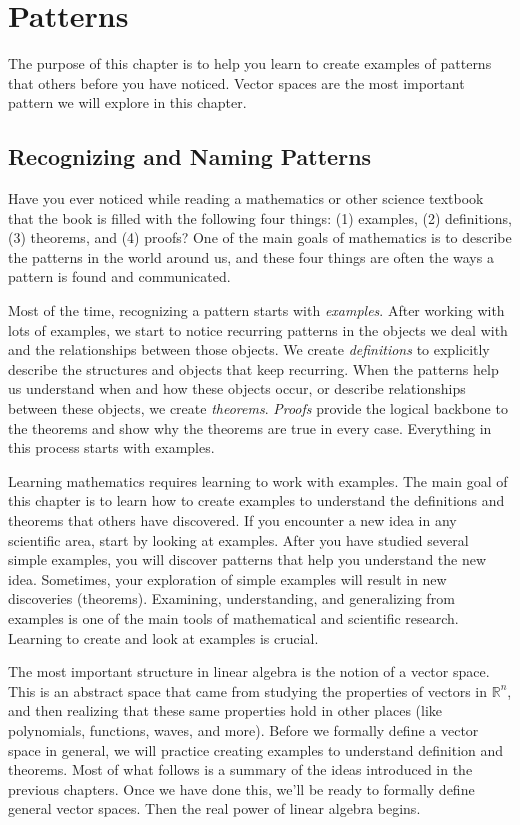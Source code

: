 \chapter{Patterns}


The purpose of this chapter is to help you learn to create examples of patterns that others before you have noticed. Vector spaces are the most important pattern we will explore in this chapter.



\section{Recognizing and Naming Patterns}

Have you ever noticed while reading a mathematics or other science textbook that the book is filled with the following four things: (1) examples, (2) definitions, (3) theorems, and (4) proofs? One of the main goals of mathematics is to describe the patterns in the world around us, and these four things are often the ways a pattern is found and communicated.  

Most of the time, recognizing a pattern starts with \emph{examples}.  After working with lots of examples, we start to notice recurring patterns in the objects we deal with and the relationships between those objects. We create \emph{definitions} to explicitly describe the structures and objects that keep recurring.  When the patterns help us understand when and how these objects occur, or describe relationships between these objects, we create \emph{theorems}.  \emph{Proofs} provide the logical backbone to the theorems and show why the theorems are true in every case. Everything in this process starts with examples.

Learning mathematics requires learning to work with examples. The main goal of this chapter is to learn how to create examples to understand the definitions and theorems that others have discovered.  If you encounter a new idea in any scientific area, start by looking at examples.  After you have studied several simple examples, you will discover patterns that help you understand the new idea.  Sometimes, your exploration of simple examples will result in new discoveries (theorems). Examining, understanding, and generalizing from examples is one of the main tools of mathematical and scientific research.  Learning to create and look at examples is crucial.

The most important structure in linear algebra is the notion of a vector space. This is an abstract space that came from studying the properties of vectors in $\mathbb{R}^n$, and then realizing that these same properties hold in other places (like polynomials, functions, waves, and more). Before we formally define a vector space in general, we will practice creating examples to understand definition and theorems.  Most of what follows is a summary of the ideas introduced in the previous chapters. Once we have done this, we'll be ready to formally define general vector spaces. Then the real power of linear algebra begins.

